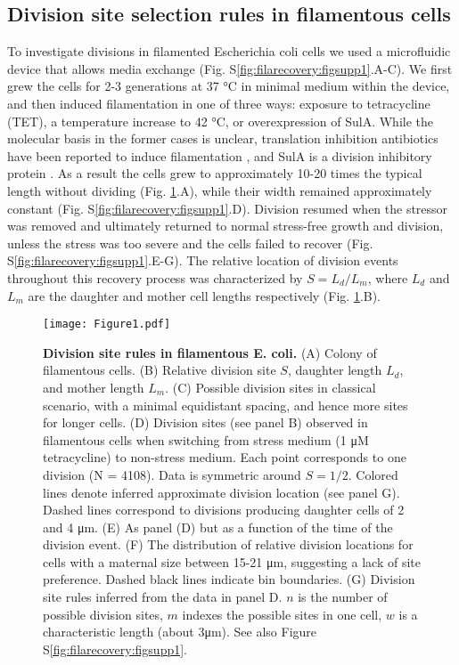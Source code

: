 \subsection{Division site selection rules in filamentous cells}
To investigate divisions in filamented Escherichia coli cells we used a microfluidic device that allows media exchange \cite{Boulineau2013} (Fig. S\ref{fig:filarecovery:figsupp1}.A-C). We first grew the cells for 2-3 generations at 37 °C in minimal medium within the device, and then induced filamentation in one of three ways: exposure to tetracycline (TET), a temperature increase to 42 °C, or overexpression of SulA. While the molecular basis in the former cases is unclear, translation inhibition antibiotics have been reported to induce filamentation \cite{Pulvertaft1952}, and SulA is a division inhibitory protein \cite{Dajkovic2008}. As a result the cells grew to approximately 10-20 times the typical length without dividing (Fig. \ref{fig:filarecovery:fig1}.A), while their width remained approximately constant (Fig. S\ref{fig:filarecovery:figsupp1}.D). Division resumed when the stressor was removed and ultimately returned to normal stress-free growth and division, unless the stress was too severe and the cells failed to recover (Fig. S\ref{fig:filarecovery:figsupp1}.E-G). The relative location of division events throughout this recovery process was characterized by $S = L_d/L_m$, where $L_d$ and $L_m$ are the daughter and mother cell lengths respectively (Fig. \ref{fig:filarecovery:fig1}.B). 

\begin{figure}
    \centering
    \texttt{[image: Figure1.pdf]}
    \caption{ 
        \textbf{Division site rules in filamentous E. coli.} 
        (A) Colony of filamentous cells. (B) Relative division site $S$, daughter length $L_d$, and mother length $L_m$. (C) Possible division sites in classical scenario, with a minimal equidistant spacing, and hence more sites for longer cells. (D) Division sites (see panel B) observed in filamentous cells when switching from stress medium (1 μM tetracycline) to non-stress medium. Each point corresponds to one division (N = 4108). Data is symmetric around $S = 1/2$. Colored lines denote inferred approximate division location (see panel G). Dashed lines correspond to divisions producing daughter cells of 2 and 4 μm. (E) As panel (D) but as a function of the time of the division event. (F) The distribution of relative division locations for cells with a maternal size between 15-21 μm, suggesting a lack of site preference. Dashed black lines indicate bin boundaries. (G) Division site rules inferred from the data in panel D. $n$ is the number of possible division sites, $m$ indexes the possible sites in one cell, $w$ is a characteristic length (about 3μm). See also Figure S\ref{fig:filarecovery:figsupp1}.        
    }
    \label{fig:filarecovery:fig1} %
\end{figure}

